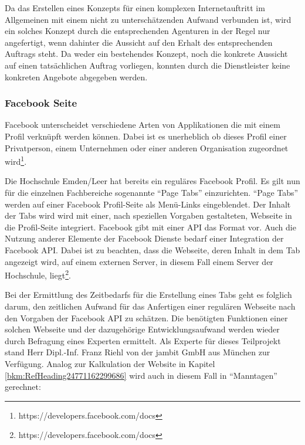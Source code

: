 \documentclass[a4paper]{article}
\begin{document}
\bigskip

{\sffamily\color{black}
Da das Erstellen eines Konzepts für einen komplexen Internetauftritt im Allgemeinen mit einem nicht zu unterschätzenden
Aufwand verbunden ist, wird ein solches Konzept durch die entsprechenden Agenturen in der Regel nur angefertigt, wenn
dahinter die Aussicht auf den Erhalt des entsprechenden Auftrags steht. Da weder ein bestehendes Konzept, noch die
konkrete Aussicht auf einen tatsächlichen Auftrag vorliegen, konnten durch die Dienstleister keine konkreten Angebote
abgegeben werden.}

\subsubsection[Facebook Seite]{\color{black} Facebook Seite}
{\sffamily
Facebook unterscheidet verschiedene Arten von Applikationen die mit einem Profil verknüpft werden können. Dabei ist es
unerheblich ob dieses Profil einer Privatperson, einem Unternehmen oder einer anderen Organisation zugeordnet
wird\footnote{https://developers.facebook.com/docs}.}


\bigskip

{\sffamily
Die Hochschule Emden/Leer hat bereits ein reguläres Facebook Profil. Es gilt nun für die einzelnen Fachbereiche
sogenannte “Page Tabs” einzurichten. “Page Tabs” werden auf einer Facebook Profil-Seite als Menü-Links eingeblendet.
Der Inhalt der Tabs wird wird mit einer, nach speziellen Vorgaben gestalteten, Webseite in die Profil-Seite integriert.
Facebook gibt mit einer API das Format vor. Auch die Nutzung anderer Elemente der Facebook Dienste bedarf einer
Integration der Facebook API. Dabei ist zu beachten, dass die Webseite, deren Inhalt in dem Tab angezeigt wird, auf
einem externen Server, in diesem Fall einem Server der Hochschule,
liegt\footnote{https://developers.facebook.com/docs}.}


\bigskip

{\sffamily
Bei der Ermittlung des Zeitbedarfs für die Erstellung eines Tabs geht es folglich darum, den zeitlichen Aufwand für das
Anfertigen einer regulären Webseite nach den Vorgaben der Facebook API zu schätzen. Die benötigten Funktionen einer
solchen Webseite und der dazugehörige Entwicklungsaufwand werden wieder durch Befragung eines Experten ermittelt. Als
Experte für dieses Teilprojekt stand Herr Dipl.-Inf. Franz Riehl von der jambit GmbH aus München zur Verfügung. Analog
zur Kalkulation der Website in Kapitel \ref{bkm:RefHeading24771162299686} wird auch in diesem Fall in “Manntagen”
gerechnet:}
\end{document}
